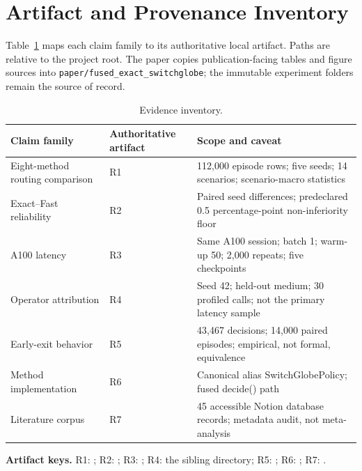 \documentclass[drones,article,submit,moreauthors]{Definitions/mdpi}
\begin{document}
\section{Artifact and Provenance Inventory}

Table~\ref{tab:inventory} maps each claim family to its authoritative local artifact. Paths are relative to the project root. The paper copies publication-facing tables and figure sources into \texttt{paper/fused\_exact\_switchglobe}; the immutable experiment folders remain the source of record.

\begin{table}[H]
\caption{Evidence inventory.}\label{tab:inventory}\small
\begin{tabularx}{\textwidth}{p{}p{}X}
\toprule
Claim family & Authoritative artifact & Scope and caveat \\
\midrule
Eight-method routing comparison & R1 & 112,000 episode rows; five seeds; 14 scenarios; scenario-macro statistics \\
Exact--Fast reliability & R2 & Paired seed differences; predeclared 0.5 percentage-point non-inferiority floor \\
A100 latency & R3 & Same A100 session; batch 1; warm-up 50; 2,000 repeats; five checkpoints \\
Operator attribution & R4 & Seed 42; held-out medium; 30 profiled calls; not the primary latency sample \\
Early-exit behavior & R5 & 43,467 decisions; 14,000 paired episodes; empirical, not formal, equivalence \\
Method implementation & R6 & Canonical alias SwitchGlobePolicy; fused decide() path \\
Literature corpus & R7 & 45 accessible Notion database records; metadata audit, not meta-analysis \\
\bottomrule
\end{tabularx}
\end{table}

\noindent\textbf{Artifact keys.} R1: ; R2: ; R3: ; R4: the sibling  directory; R5: ; R6: ; R7: .
\end{document}
